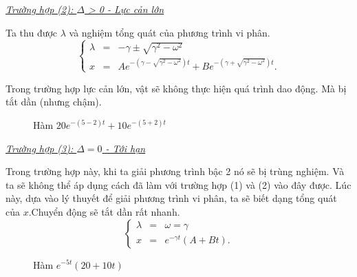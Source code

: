 \documentclass[12pt]{article}
\begin{document}
\newpage
\vspace{2mm}

\underline{\textit{Trường hợp (2): \(\Delta\) > 0 - Lực cản lớn}}

Ta thu được \(\lambda\) và nghiệm tổng quát của phương trình vi phân.
\begin{equation}
    \left\{
    \begin{array}{ccc}
    \lambda &=& - \gamma \pm   \sqrt{\gamma^2 - \omega^2} \\
    x &=& A e^{- \left( \gamma - \sqrt{\gamma^2 - \omega^2}\right)  t} + B e^{- \left( \gamma + \sqrt{\gamma^2 - \omega^2}\right) t}.
    \end{array}
    \right.
\end{equation}

Trong trường hợp lực cản lớn, vật sẽ không thực hiện quá trình dao động. Mà bị tắt dần (nhưng chậm).

\begin{figure}[!htb]
    \centering
    \caption{Hàm \(20 e^{-(5-2)t} + 10 e^{-(5+2)t}\)}
    \label{fig:1.8}
\end{figure}
\vspace{2mm}

\underline{\textit{Trường hợp (3): \(\Delta = 0\) - Tới hạn}}

Trong trường hợp này, khi ta giải phương trình bậc 2 nó sẽ bị trùng nghiệm. Và ta sẽ không thể áp dụng cách đã làm với trường hợp (1) và (2) vào đây được. Lúc này, dựa vào lý thuyết để giải phương trình vi phân, ta sẽ biết dạng tổng quát của \(x\).Chuyển động sẽ tắt dần rất nhanh. 
\begin{equation}
    \left\{
    \begin{array}{ccc}
    \lambda &=& \omega = \gamma \\
    x &=& e^{-\gamma t} \left( A + B t\right).
    \end{array}
    \right.
\end{equation}

\begin{figure}[!htb]
    \centering
    \caption{Hàm \(e^{-5t} \left(20 + 10t\right)\)}
    \label{fig:1.9}
\end{figure}
\vspace{2mm}
\end{document}
